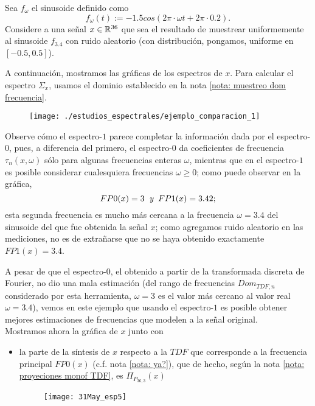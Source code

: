 \begin{ejemplo}
\label{ej: espectros comparacion}

Sea $f_{\omega}$
el sinusoide definido como
\begin{equation}
\label{eq: sinusoide eje}
f_{\omega}(t) := -1.5 cos (2 \pi \cdot \omega t + 2 \pi \cdot 0.2).
\end{equation}
Considere a una señal $x \in \mathbb{R}^{36}$ que sea el resultado
de muestrear uniformemente al sinusoide
$f_{3.4}$
con ruido aleatorio 
(con distribución, pongamos, uniforme en $[-0.5, 0.5]$).

A continuación, mostramos las gráficas
de los espectros de $x$. Para
calcular el espectro $\Sigma_{x}$,
usamos el dominio
establecido en la nota 
\ref{nota: muestreo dom frecuencia}.

\begin{figure}[H]
\centering
	\sidecaption{\label{fig: ejemplo_comparacion}}
    \texttt{[image: ./estudios\_espectrales/ejemplo\_comparacion\_1]}
\end{figure}


Observe cómo el espectro-$1$ parece completar la información
dada por el espectro-$0$, pues, a diferencia del primero,
el espectro-$0$
da coeficientes de frecuencia $\tau_{n}(x, \omega)$ sólo
para algunas frecuencias enteras $\omega$, mientras que en el espectro-$1$
es posible considerar cualesquiera frecuencias $\omega \geq 0$; como puede observar
en la gráfica, 
\[
FP0 (x) = 3 \hspace{0.2cm} \textit{y} \hspace{0.2cm}
FP1 (x) = 3.42;
\]
esta segunda frecuencia es mucho más cercana a
la frecuencia $\omega =3.4$ del sinusoide del que
fue obtenida la señal $x$; como agregamos ruido
aleatorio en las mediciones, no 
es de extrañarse que no se haya
obtenido exactamente $FP1(x) = 3.4$.

A pesar de que el espectro-$0$, el obtenido a partir de la
transformada discreta de Fourier, no dio una mala estimación (del rango
de frecuencias $Dom_{TDF,n}$ considerado por esta herramienta,
$\omega =3$ es el valor más cercano al valor real $\omega = 3.4$), vemos en este
ejemplo que usando el espectro-$1$ es posible obtener mejores
estimaciones de frecuencias que modelen a la señal original. \\

Mostramos ahora la gráfica de $x$ junto con
\begin{itemize}
	\item la parte de la síntesis de $x$ respecto a la $TDF$
	que corresponde a la frecuencia principal
	$FP0(x)$ (c.f.
	nota \ref{nota: ya?}), que de hecho,
	según la nota \ref{nota: proyeciones monof TDF}, es
	$\Pi_{P_{36,3}}(x)$
	\begin{figure}[H]
			\centering
			\texttt{[image: 31May\_esp5]} 
		\end{figure}		
	

\end{itemize}
\end{ejemplo}
